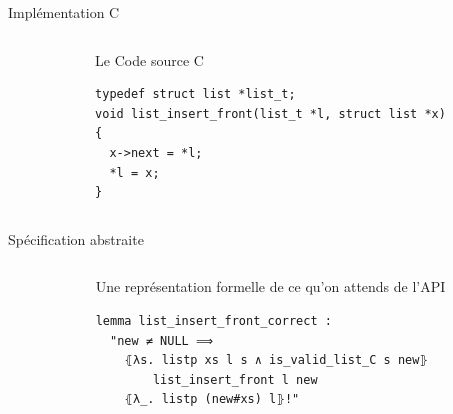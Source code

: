 \documentclass[hyperref={pdfpagelabels=false}]{beamer}
\begin{document}
\begin{frame}[fragile]{Implémentation C}
  \begin{columns}[T] %
    \begin{column}{.15\textwidth}
    \end{column}%
    \hfill%
    \begin{column}{.83\textwidth}
      Le Code source C
      \begin{tcolorbox}[title=Exemple]
        \begin{verbatim}
typedef struct list *list_t;
void list_insert_front(list_t *l, struct list *x)
{
  x->next = *l;
  *l = x;
} 
        \end{verbatim}
      \end{tcolorbox}
    \end{column}%
  \end{columns}
\end{frame}



\begin{frame}[fragile]{Spécification abstraite}
  \begin{columns}[T] %
    \begin{column}{.15\textwidth}
    \end{column}%
    \hfill%
    \begin{column}{.83\textwidth}
      Une représentation formelle de ce qu'on attends de l'API
      \begin{tcolorbox}[title=Exemple]
        \begin{lstlisting}
lemma list_insert_front_correct : 
  "new ≠ NULL ⟹
    ⦃λs. listp xs l s ∧ is_valid_list_C s new⦄
        list_insert_front l new
    ⦃λ_. listp (new#xs) l⦄!"
        \end{lstlisting}
      \end{tcolorbox}
    \end{column}%
  \end{columns}
\end{frame}
\end{document}
